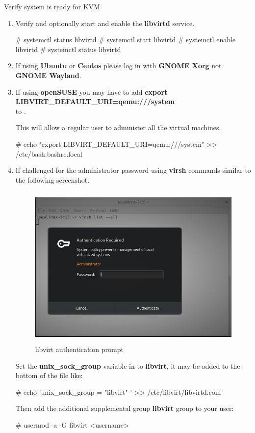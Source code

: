 \begin{Lab}
\begin{exe} {Verify system is ready for KVM }
\begin{sol}
\begin{enumerate}
         \item
         Verify and optionally start and enable the \textbf{libvirtd} service.

         \begin{raw}
# systemctl status libvirtd
# systemctl start libvirtd
# systemctl enable libvirtd
# systemctl status libvirtd
         \end{raw}

 	\item 
	If using \textbf{Ubuntu} or \textbf{Centos} please log in 
		      with \textbf{GNOME Xorg} not \textbf{GNOME Wayland}.
	\item 
	If using \textbf{openSUSE} you may have to add 
		      \textbf{export LIBVIRT\_DEFAULT\_URI=qemu:///system} \\
		      to 
		      .  
		      
		      This will allow a regular user 
		      to administer all the virtual machines. 
		      \begin{raw}
# echo "export LIBVIRT_DEFAULT_URI=qemu:///system"  >> /etc/bash.bashrc.local
			\end{raw}
	\item 
	If challenged for the administrator password using \textbf{virsh} commands 
		      similar to the following screenshot.


\begin{figure}[H]
      \includegraphics[height=3.2in]{IMAGES/libvirt-auth.png}
      \caption{libvirt authentication prompt}
   \end{figure}



	Set the \textbf{unix\_sock\_group} variable in 
		      to \textbf{libvirt}, it may be added to the bottom of the file like:
		      \begin{raw}
# echo 'unix_sock_group = "libvirt" ' >> /etc/libvirt/libvirtd.conf
			\end{raw}
			Then add the additional supplemental group \textbf{libvirt} group to your user:
			\begin{raw}
# usermod -a -G libvirt <username> 
			\end{raw} 


\end{enumerate}
\end{sol}
\end{exe}
\end{Lab}
